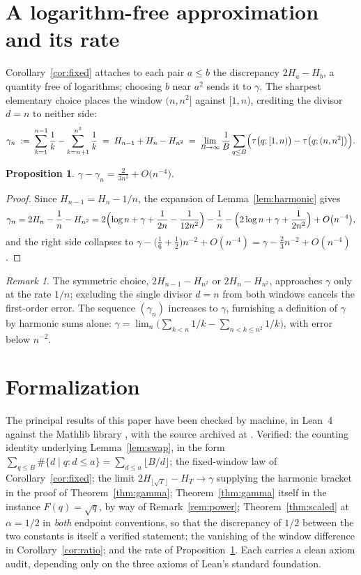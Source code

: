 \documentclass[11pt]{amsart}
\newtheorem{proposition}[theorem]{Proposition}
\theoremstyle{remark}
\newtheorem{remark}[theorem]{Remark}
\newcommand{\eul}{\gamma}
\DeclareMathOperator{\divc}{\tau}
\begin{document}
\section{A logarithm-free approximation and its rate}\label{sec:rate}

Corollary~\ref{cor:fixed} attaches to each pair $a\le b$ the
discrepancy $2H_{a}-H_{b}$, a quantity free of logarithms; choosing
$b$ near $a^{2}$ sends it to $\eul$.  The sharpest elementary choice
places the window $(n,n^{2}]$ against $[1,n)$, crediting the divisor
$d=n$ to neither side:
\[
\eul_{n}
\;:=\;\sum_{k=1}^{n-1}\frac1k-\sum_{k=n+1}^{n^{2}}\frac1k
\;=\;H_{n-1}+H_{n}-H_{n^{2}}
\;=\;\lim_{B\to\infty}\frac1B\sum_{q\le B}
\Bigl(\divc\bigl(q;[1,n)\bigr)-\divc\bigl(q;(n,n^{2}]\bigr)\Bigr).
\]

\begin{proposition}\label{prop:rate}
$\displaystyle
\eul-\eul_{n}=\frac{2}{3n^{2}}+O\bigl(n^{-4}\bigr).$
\end{proposition}

\begin{proof}
Since $H_{n-1}=H_{n}-1/n$, the expansion of Lemma~\ref{lem:harmonic}
gives
\[
\eul_{n}
=2H_{n}-\frac1n-H_{n^{2}}
=2\Bigl(\log n+\eul+\frac1{2n}-\frac1{12n^{2}}\Bigr)-\frac1n
-\Bigl(2\log n+\eul+\frac1{2n^{2}}\Bigr)+O\bigl(n^{-4}\bigr),
\]
and the right side collapses to
$\eul-\bigl(\tfrac16+\tfrac12\bigr)n^{-2}+O(n^{-4})
=\eul-\tfrac{2}{3}n^{-2}+O(n^{-4})$.
\end{proof}

\begin{remark}
The symmetric choice, $2H_{n-1}-H_{n^{2}}$ or $2H_{n}-H_{n^{2}}$,
approaches $\eul$ only at the rate $1/n$; excluding the single divisor
$d=n$ from both windows cancels the first-order error.  The sequence
$(\eul_{n})$ increases to $\eul$, furnishing a definition of $\eul$
by harmonic sums alone:
$\eul=\lim_{n}\bigl(\sum_{k<n}1/k-\sum_{n<k\le n^{2}}1/k\bigr)$, with
error below $n^{-2}$.
\end{remark}

\section{Formalization}\label{sec:formalization}

The principal results of this paper have been checked by machine, in
Lean~4 against the Mathlib library \cite{mathlib}, with the source
archived at \cite{repo}.  Verified: the counting identity underlying
Lemma~\ref{lem:swap}, in the form
$\sum_{q\le B}\#\{d\mid q: d\le a\}=\sum_{d\le a}\lfloor B/d\rfloor$;
the fixed-window law of Corollary~\ref{cor:fixed}; the limit
$2H_{\lfloor\sqrt T\rfloor}-H_{T}\to\eul$ supplying the harmonic bracket
in the proof of Theorem~\ref{thm:gamma}; Theorem~\ref{thm:gamma} itself
in the instance $F(q)=\sqrt q$, by way of Remark~\ref{rem:power};
Theorem~\ref{thm:scaled} at $\alpha=1/2$ in \emph{both} endpoint
conventions, so that the discrepancy of $1/2$ between the two constants
is itself a verified statement; the vanishing of the window difference
in Corollary~\ref{cor:ratio}; and the rate of
Proposition~\ref{prop:rate}.  Each carries a clean axiom audit,
depending only on the three axioms of Lean's standard foundation.
\end{document}
